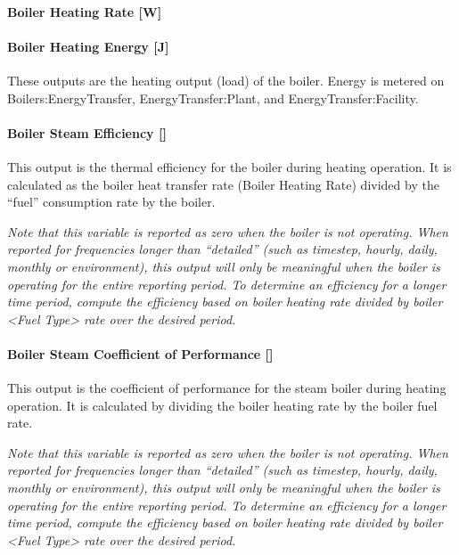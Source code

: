 \paragraph{Boiler Heating Rate {[}W{]}}\label{boiler-heating-rate-w-1}

\paragraph{Boiler Heating Energy {[}J{]}}\label{boiler-heating-energy-j-1}

These outputs are the heating output (load) of the boiler. Energy is metered on Boilers:EnergyTransfer, EnergyTransfer:Plant, and EnergyTransfer:Facility.

\paragraph{Boiler Steam Efficiency {[]}}\label{boiler-steam-efficiency}

This output is the thermal efficiency for the boiler during heating operation. It is calculated as the boiler heat transfer rate (Boiler Heating Rate) divided by the ``fuel'' consumption rate by the boiler.

\emph{Note that this variable is reported as zero when the boiler is not operating. When reported for frequencies longer than ``detailed'' (such as timestep, hourly, daily, monthly or environment), this output will only be meaningful when the boiler is operating for the entire reporting period. To determine an efficiency for a longer time period, compute the efficiency based on boiler heating rate divided by boiler \textless{}Fuel Type\textgreater{} rate over the desired period.}

\paragraph{Boiler Steam Coefficient of Performance {[]}}\label{boile-steamr-coefficient-of-performance}

This output is the coefficient of performance for the steam boiler during heating operation. It is calculated by dividing the boiler heating rate by the boiler fuel rate.

\emph{Note that this variable is reported as zero when the boiler is not operating. When reported for frequencies longer than ``detailed'' (such as timestep, hourly, daily, monthly or environment), this output will only be meaningful when the boiler is operating for the entire reporting period. To determine an efficiency for a longer time period, compute the efficiency based on boiler heating rate divided by boiler \textless{}Fuel Type\textgreater{} rate over the desired period.}

